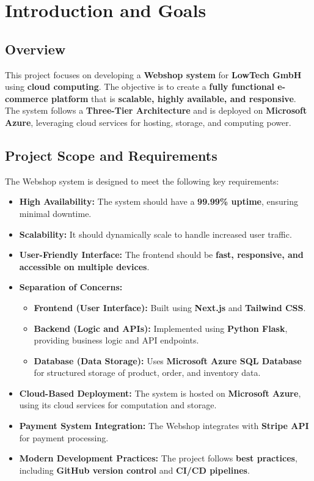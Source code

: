 \hypertarget{introduction-and-goals}{%
\section{Introduction and Goals}\label{section-introduction-and-goals}}

\subsection{Overview}
This project focuses on developing a \textbf{Webshop system} for \textbf{LowTech GmbH} using \textbf{cloud computing}. The objective is to create a \textbf{fully functional e-commerce platform} that is \textbf{scalable, highly available, and responsive}. The system follows a \textbf{Three-Tier Architecture} and is deployed on \textbf{Microsoft Azure}, leveraging cloud services for hosting, storage, and computing power.

\subsection{Project Scope and Requirements}
The Webshop system is designed to meet the following key requirements:

\begin{itemize}
    \item \textbf{High Availability:} The system should have a \textbf{99.99\% uptime}, ensuring minimal downtime.
    \item \textbf{Scalability:} It should dynamically scale to handle increased user traffic.
    \item \textbf{User-Friendly Interface:} The frontend should be \textbf{fast, responsive, and accessible on multiple devices}.
    \item \textbf{Separation of Concerns:}
    \begin{itemize}
        \item \textbf{Frontend (User Interface):} Built using \textbf{Next.js} and \textbf{Tailwind CSS}.
        \item \textbf{Backend (Logic and APIs):} Implemented using \textbf{Python Flask}, providing business logic and API endpoints.
        \item \textbf{Database (Data Storage):} Uses \textbf{Microsoft Azure SQL Database} for structured storage of product, order, and inventory data.
    \end{itemize}
    \item \textbf{Cloud-Based Deployment:} The system is hosted on \textbf{Microsoft Azure}, using its cloud services for computation and storage.
    \item \textbf{Payment System Integration:} The Webshop integrates with \textbf{Stripe API} for payment processing.
    \item \textbf{Modern Development Practices:} The project follows \textbf{best practices}, including \textbf{GitHub version control} and \textbf{CI/CD pipelines}.
\end{itemize}

